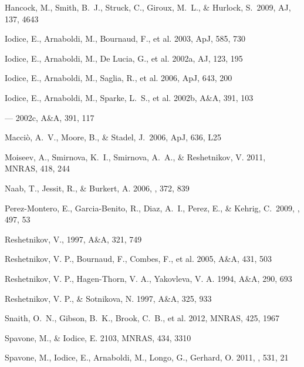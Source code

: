 \documentclass[11pt,twoside]{article}
\begin{document}
\begin{thebibliography}{}
 Hancock, M., Smith, B.~J., 
Struck, C., Giroux, M.~L., \& Hurlock, S.\ 2009, AJ, 137, 4643

 Iodice, E., Arnaboldi, 
M., Bournaud, F., et al. 2003, ApJ, 585, 730

 Iodice, E., 
Arnaboldi, M., De Lucia, G., et al. 2002a, AJ, 123, 195

 Iodice, E., 
Arnaboldi, M., Saglia, R., et al. 2006, ApJ, 643, 200

 Iodice, E., 
Arnaboldi, M., Sparke, L.~S., et al.  2002b, A\&A, 391, 103

---  2002c, A\&A, 391, 117

 Macci{\`o}, A.~V., 
Moore, B., \& Stadel, J.\ 2006, ApJ, 636, L25

 Moiseev, A., 
Smirnova, K.~I., Smirnova, A.~A., \& Reshetnikov, V. 2011, MNRAS, 418,
244

 Naab, T., Jessit, R., 
\& Burkert, A. 2006, \mnras, 372, 839

 Perez-Montero, E., 
Garcia-Benito, R., Diaz, A.~I., Perez, E., \& Kehrig, C.\ 2009, \aap,
497, 53

 Reshetnikov, V., 1997,  
A\&A, 321, 749

 Reshetnikov, V. P.,  
Bournaud, F., Combes, F., et al. 2005, A\&A, 431, 503

 Reshetnikov, V. P., 
Hagen-Thorn, V. A., Yakovleva, V. A. 1994, A\&A, 290, 693

 Reshetnikov, V. P., 
\& Sotnikova, N. 1997, A\&A, 325, 933

 Snaith, O.~N., Gibson, 
B.~K., Brook, C.~B., et al. 2012, MNRAS, 425, 1967

 Spavone, M., \& 
Iodice, E. 2103, MNRAS, 434, 3310

 Spavone, M., 
Iodice, E., Arnaboldi, M., Longo, G., Gerhard, O. 2011, \aap, 531, 21


\end{thebibliography}
\end{document}
